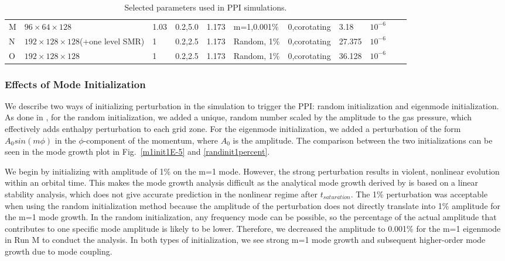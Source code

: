 \documentclass[iop,revtex4]{emulateapj}
\begin{document}
\begin{table}[t]
\begin{tabular}{lllllllllll}
    M & $96\times64\times128$  & 1.03       & 0.2,5.0          & 1.173 & m=1,0.001\%  & 0,corotating                  & 3.18               & $10^{-6}$ \\
    N & $192\times128\times128$(+one level SMR)  & 1      & 0.2,2.5          & 1.173 & Random, 1\%  & 0,corotating                  & 27.375               & $10^{-6}$ \\    
    O & $192\times128\times128$  & 1      & 0.2,2.5          & 1.173 & Random, 1\%  & 0,corotating                  & 36.128               & $10^{-6}$ \\    
     \hline
    \end{tabular}
    \caption{Selected parameters used in \ac{PPI} simulations.}
 \label{parameters}\end{table}
 \subsubsection{Effects of Mode Initialization}
\par  We describe two ways of initializing perturbation in the simulation to trigger the \ac{PPI}: random initialization and eigenmode initialization. As done in  \cite{Hawley:1991A}, for the random initialization, we added a unique, random number scaled by the amplitude to the gas pressure, which effectively adds enthalpy perturbation to each grid zone. For the eigenmode initialization, we added a perturbation of the form $A_0 sin(m\phi)$ in the $\phi$-component of the momentum, where $A_0$ is the amplitude. The comparison between the two initializations can be seen in the mode growth plot in Fig.~\ref{m1init1E-5} and \ref{randinit1percent}.
\par We begin by initializing with amplitude of 1\% on the m=1 mode. However, the strong perturbation results in violent, nonlinear evolution within an orbital time. This makes the mode growth analysis difficult as the analytical mode growth derived by \cite{Goldreich:1986A} is based on a linear stability analysis, which does not give accurate prediction in the nonlinear regime after $t_{saturation}$. The 1\% perturbation was acceptable when using the random initialization method because the amplitude of the perturbation does not directly translate into 1\% amplitude for the m=1 mode growth. In the random initialization,  any frequency mode can be possible, so the percentage of the actual amplitude that contributes to one specific mode amplitude is likely to be lower. Therefore, we decreased the amplitude to 0.001\% for the m=1 eigenmode in Run M to conduct the analysis. In both types of initialization, we see strong m=1 mode growth and subsequent higher-order mode growth due to mode coupling.
\end{document}
